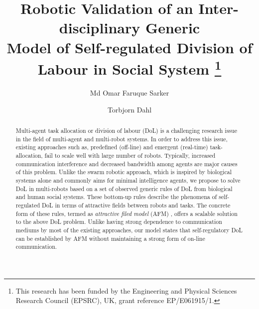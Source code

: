 \documentclass{llncs}
\begin{document}
\title{Robotic Validation of an Inter-disciplinary Generic\\
Model of Self-regulated Division of Labour in Social System
\thanks{This research has been funded by the Engineering and Physical Sciences Research Council (EPSRC), UK, grant reference EP/E061915/1.}
}
\author{Md Omar Faruque Sarker \and
	Torbjorn Dahl %
}
\maketitle
\begin{abstract}
Multi-agent task allocation or division of labour (DoL) is a challenging research issue in the field of multi-agent and multi-robot systems. In order to address this issue, existing approaches such as, predefined (off-line) and emergent (real-time) task-allocation, fail to scale well with large number of robots. Typically, increased communication interference and decreased bandwidth among agents are major causes of this problem. Unlike the swarm robotic approach, which is inspired by biological systems alone and commonly aims for minimal intelligence agents, we propose to solve DoL in multi-robots based on a set of observed generic rules of DoL from biological and human social systems. These bottom-up rules describe the phenomena of self-regulated DoL in terms of attractive fields between robots and tasks. The concrete form of these rules, termed as \textit{attractive filed model} (AFM) \cite{RefElsa}, offers a scalable solution to the above DoL problem. Unlike having strong dependence to communication mediums by most of the existing approaches, our model states that self-regulatory DoL can be established by AFM without maintaining a strong form of on-line communication. 
\end{abstract}
\end{document}
